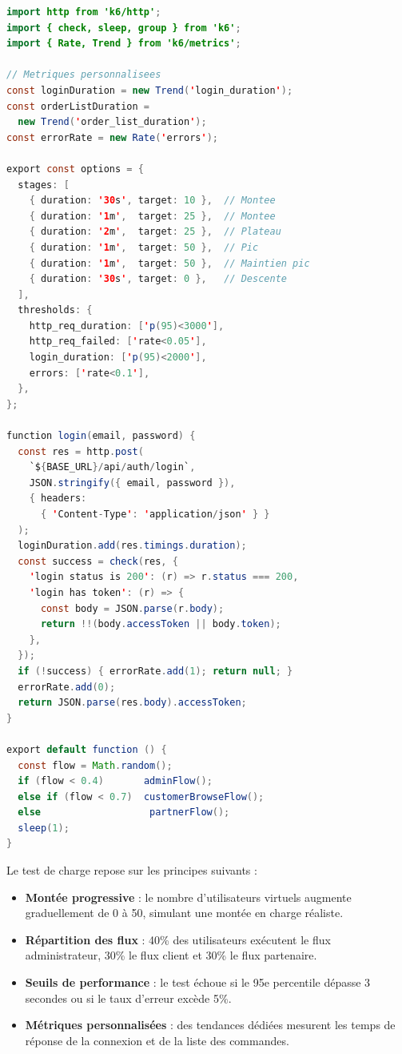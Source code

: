 \begin{lstlisting}[language=Java, caption={Test de charge k6 -- k6-load-test.js}, label={lst:k6-load-test}]
import http from 'k6/http';
import { check, sleep, group } from 'k6';
import { Rate, Trend } from 'k6/metrics';

// Metriques personnalisees
const loginDuration = new Trend('login_duration');
const orderListDuration =
  new Trend('order_list_duration');
const errorRate = new Rate('errors');

export const options = {
  stages: [
    { duration: '30s', target: 10 },  // Montee
    { duration: '1m',  target: 25 },  // Montee
    { duration: '2m',  target: 25 },  // Plateau
    { duration: '1m',  target: 50 },  // Pic
    { duration: '1m',  target: 50 },  // Maintien pic
    { duration: '30s', target: 0 },   // Descente
  ],
  thresholds: {
    http_req_duration: ['p(95)<3000'],
    http_req_failed: ['rate<0.05'],
    login_duration: ['p(95)<2000'],
    errors: ['rate<0.1'],
  },
};

function login(email, password) {
  const res = http.post(
    `${BASE_URL}/api/auth/login`,
    JSON.stringify({ email, password }),
    { headers:
      { 'Content-Type': 'application/json' } }
  );
  loginDuration.add(res.timings.duration);
  const success = check(res, {
    'login status is 200': (r) => r.status === 200,
    'login has token': (r) => {
      const body = JSON.parse(r.body);
      return !!(body.accessToken || body.token);
    },
  });
  if (!success) { errorRate.add(1); return null; }
  errorRate.add(0);
  return JSON.parse(res.body).accessToken;
}

export default function () {
  const flow = Math.random();
  if (flow < 0.4)       adminFlow();
  else if (flow < 0.7)  customerBrowseFlow();
  else                   partnerFlow();
  sleep(1);
}
\end{lstlisting}

Le test de charge repose sur les principes suivants :

\begin{itemize}
  \item \textbf{Montée progressive} : le nombre d'utilisateurs virtuels augmente
        graduellement de 0 à 50, simulant une montée en charge réaliste.
  \item \textbf{Répartition des flux} : 40\% des utilisateurs exécutent le flux
        administrateur, 30\% le flux client et 30\% le flux partenaire.
  \item \textbf{Seuils de performance} : le test échoue si le 95e percentile
        dépasse 3 secondes ou si le taux d'erreur excède 5\%.
  \item \textbf{Métriques personnalisées} : des tendances dédiées mesurent les
        temps de réponse de la connexion et de la liste des commandes.
\end{itemize}

